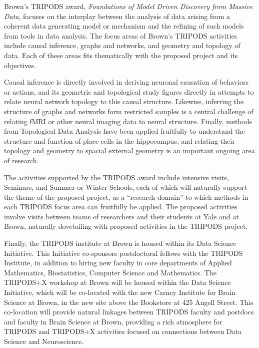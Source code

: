  Brown's TRIPODS award, \emph{Foundations of Model Driven Discovery from Massive Data}, focuses on the interplay between the analysis of data arising from a coherent data generating model or mechanism and the refining of such models from tools in data analysis. The focus areas of Brown's TRIPODS activities include causal inference, graphs and networks, and geometry and topology of data. Each of these areas fits thematically with the proposed project and its objectives.

Causal inference is directly involved in deriving neuronal causation of behaviors or actions, and its geometric and topological study figures directly in attempts to relate neural network topology to this causal structure.
Likewise, inferring the structure of graphs and networks form restricted samples is a central challenge of relating fMRI or other neural imaging data to neural structure. 
Finally, methods from Topological Data Analysis have been applied fruitfully to understand the structure and function of place cells in the hippocampus, and relating their topology and geometry to spacial external geometry is an important ongoing area of research.

The activities supported by the TRIPODS award include intensive visits, Seminars, and Summer or Winter Schools, each of which will naturally support the theme of the proposed project, as a ``research domain'' to which methods in each TRIPODS focus area can fruitfully be applied. The proposed activities involve visits between teams of researchers and their students at Yale and at Brown, naturally dovetailing with proposed activities in the TRIPODS project. 

Finally, the TRIPODS institute at Brown is housed within its Data Science Initiative. This Initiative co-sponsors postdoctoral fellows with the TRIPODS Institute, in addition to hiring new faculty in core departments of Applied Mathematics, Biostatistics, Computer Science and Mathematics. The TRIPODS+X workshop at Brown will be housed within the Data Science Initiative, which will be co-located with the new Carney Institute for Brain Science at Brown, in the new site above the Bookstore at 425 Angell Street. This co-location will provide natural linkages between TRIPODS faculty and postdocs and faculty in Brain Science at Brown, providing a rich atmosphere for TRIPODS and TRIPODS+X activities focused on connections between Data Science and Neuroscience.